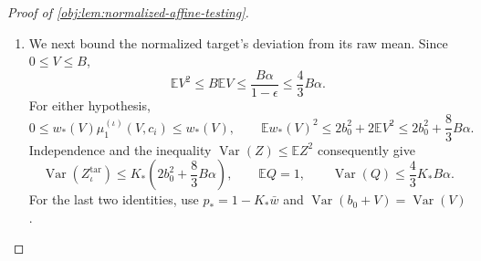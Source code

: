 \begin{proof}[Proof of \cref{obj:lem:normalized-affine-testing}]
\begin{enumerate}
Uniformly ordering each channel's histogram is another common probability kernel. Its conditional law is the ordered Poisson experiment from the normalized table. To see this, for a probability mass function \(p_{\mathrm{mark}}\) on a finite alphabet \(\mathscr Z\), put
\[
\kappa_{\mathrm{tot}}=\sum_{z\in\mathscr Z}\kappa_z.
\]
The independent-count probabilities factor as
\[
\prod_{z\in\mathscr Z}
e^{-\lambda_{\mathrm P}p_{\mathrm{mark}}(z)}
\frac{(\lambda_{\mathrm P}p_{\mathrm{mark}}(z))^{\kappa_z}}{\kappa_z!}
=
e^{-\lambda_{\mathrm P}}
\frac{\lambda_{\mathrm P}^{\kappa_{\mathrm{tot}}}}{\kappa_{\mathrm{tot}}!}
\frac{\kappa_{\mathrm{tot}}!}{\prod_z\kappa_z!}
\prod_zp_{\mathrm{mark}}(z)^{\kappa_z}.
\]
Thus, conditional on the latent table, the ordered channels have the following law:
\[
\begin{aligned}
J_{\mathrm L}&\sim\operatorname{Poi}(uQ),&
\mathcal L_{\mathrm{raw}}\mid J_{\mathrm L}=k
&\sim P_\iota(\boldsymbol\lambda)^{\otimes k},\\
J_{\mathrm A}&\sim\operatorname{Poi}(wQ),&
\mathcal X_{\mathrm{raw}}\mid J_{\mathrm A}=k
&\sim(P_\iota(\boldsymbol\lambda))_{XA}^{\otimes k}.
\end{aligned}
\]
Both channels are independent conditional on the latent table. Their domains are
\[
\mathcal L_{\mathrm{raw}}\in
\bigsqcup_{k\ge0}
\bigl(\{1,\ldots,d\}\times\{0,1\}^2\bigr)^k,
\qquad
\mathcal X_{\mathrm{raw}}\in
\bigsqcup_{k\ge0}
\bigl(\{1,\ldots,d\}\times\{0,1\}\bigr)^k,
\]
with the empty tuple at length zero.

Append the independent seed \(U\sim\mathrm{Uniform}[0,1]\), and define
\[
\mathcal Q_\iota^{\mathrm{raw}}
=\operatorname{Law}(\mathcal L_{\mathrm{raw}},
                    \mathcal X_{\mathrm{raw}},U\mid\iota),
\]
where the latent table is mixed according to \(\nu_{\mathrm{lat}}\). Common kernels and a common independent seed preserve the distance bound, so
\[
\operatorname{TV}(\mathcal Q_1^{\mathrm{raw}},
                  \mathcal Q_0^{\mathrm{raw}})<\frac1{64}.
\]

\item
We next bound the normalized target's deviation from its raw mean. Since \(0\le V\le B\),
\[
\mathbb EV^2\le B\mathbb EV
\le\frac{B\alpha}{1-\epsilon}
\le\frac43B\alpha.
\]
For either hypothesis,
\[
0\le w_*(V)\mu_1^{(\iota)}(V,c_i)\le w_*(V),
\qquad
\mathbb Ew_*(V)^2
\le2b_0^2+2\mathbb EV^2
\le2b_0^2+\frac83B\alpha.
\]
Independence and the inequality
\(\operatorname{Var}(Z)\le\mathbb EZ^2\) consequently give
\[
\operatorname{Var}(Z_\iota^{\mathrm{tar}})
\le K_*\left(2b_0^2+\frac83B\alpha\right),
\qquad
\mathbb EQ=1,
\qquad
\operatorname{Var}(Q)\le\frac43K_*B\alpha.
\]
For the last two identities, use \(p_*=1-K_*\bar w\) and
\(\operatorname{Var}(b_0+V)=\operatorname{Var}(V)\).


\end{enumerate}
\end{proof}
